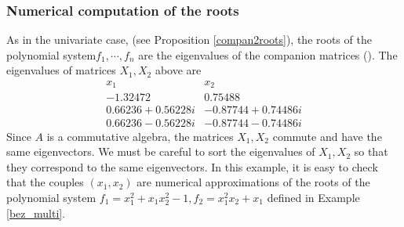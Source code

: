 \documentclass{standalone}
\begin{document}
\subsubsection{Numerical computation of the roots}
As in the univariate case, (see Proposition \ref{compan2roots}), the roots of the polynomial system$f_1, \cdots, f_n$ are the eigenvalues of the companion matrices (\cite{AS}). The eigenvalues of matrices $X_1, X_2$ above are
$$
\begin{array}{c|c}
	x_1 & x_2 \\
	\hline
	-1.32472  & 0.75488 \\
	0.66236 + 0.56228i & -0.87744 + 0.74486i \\
	0.66236 - 0.56228i & -0.87744 - 0.74486i
\end{array}
$$
Since $A$ is a commutative algebra, the matrices $X_1, X_2$ commute and have the same eigenvectors. We must be careful to sort the eigenvalues of $X_1, X_2$ so that they correspond to the same eigenvectors. In this example, it is easy to check that the couples $(x_1, x_2)$ are numerical approximations of the roots of the polynomial system $f_1 = x_1^2 + x_1x_2^2 - 1, f_2 = x_1^2x_2 + x_1$ defined in Example \ref{bez_multi}.
\end{document}
